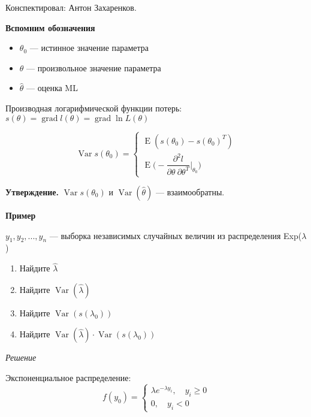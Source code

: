 \documentclass[12pt]{article} %
\theoremstyle{definition} %
\DeclareMathOperator{\Var}{Var}
\DeclareMathOperator{\E}{E}
\DeclareMathOperator{\grad}{grad}
\def \htheta{\hat{\theta}}
\def \hlambda{\hat{\lambda}}
\begin{document}
Конспектировал: Антон Захаренков.
\bigskip

\smallskip

\textbf{Вспомним обозначения}


\begin{itemize}[label={$\bullet$}]
        \item $\theta_0$ --- истинное значение параметра
        \item $\theta$ --- произвольное значение параметра
        \item $\htheta$ --- оценка ML
\end{itemize}

Производная логарифмической функции потерь:
$s(\theta) = \grad l(\theta) = \grad \ln L(\theta)$

\begin{equation}
    \Var s(\theta_0)=
    \begin{cases}
      \E ( s(\theta_0) - s(\theta_0)^T ) \\[5pt]
      \E \Big(-\dfrac{\partial^2 l}{\partial \theta \: \partial \theta^T}\Big\rvert_{\theta_0} \Big)
    \end{cases}
  \end{equation}


\smallskip
\textbf{Утверждение.} $\Var s(\theta_0)$ и $\Var (\htheta)$ --- взаимообратны.



\bigskip
\textbf{Пример}

    $y_1, y_2, ..., y_n$ --- выборка независимых случайных величин из распределения Exp($\lambda$)
    
\medskip    
\begin{enumerate}
    \item Найдите $\hlambda$ 
    \item Найдите $\Var(\hlambda)$ 
    \item Найдите $\Var(s(\lambda_0))$ 
    \item Найдите $\Var(\hlambda) \cdot \Var(s(\lambda_0))$
\end{enumerate}
    
\medskip    
\emph{Решение}

Экспоненциальное распределение: \begin{equation}
    f(y_0)=
    \begin{cases}
      \lambda e^{-\lambda y_i},\quad y_i \geq 0\\[5pt]
      0,\quad y_i < 0
    \end{cases}
  \end{equation} 
  
\end{document}
